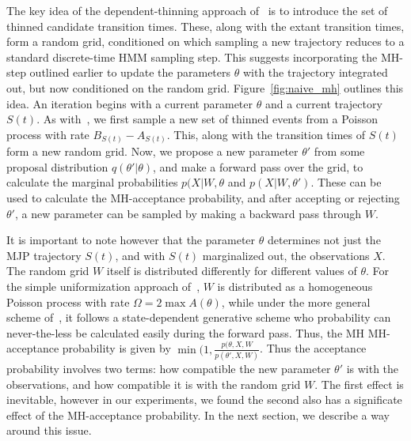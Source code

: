 The key idea of the dependent-thinning approach of~\cite{RaoTeh13} is
to introduce the set of thinned candidate transition times. These,
along with the extant transition times, form a random grid,
conditioned on which sampling a new trajectory reduces to a 
standard discrete-time HMM sampling step. This suggests incorporating
the MH-step outlined earlier to update the parameters $\theta$
with the trajectory integrated out, but now conditioned on the random
grid. Figure~\ref{fig:naive_mh} outlines this idea.
An iteration begins with a current parameter $\theta$ and a current
trajectory $S(t)$. As with~\cite{RaoTeh12}, we first sample
a new set of thinned events from a Poisson process with rate
$B_{S(t)}-A_{S(t)}$. This, along with the transition times of
$S(t)$ form a new random grid. Now, we propose a new parameter 
$\theta'$ from some proposal distribution $q(\theta'|\theta)$,
and make a forward pass over the grid, to calculate the marginal
probabilities $p(X|W,\theta$ and $p(X|W,\theta')$. These can be
used to calculate the MH-acceptance probability, and after accepting
or rejecting $\theta'$, a new parameter can be sampled by making
a backward pass through $W$.

It is important to note however that the parameter $\theta$
determines not just the MJP trajectory $S(t)$, and with $S(t)$ 
marginalized out, the observations $X$. The random grid $W$ itself
is distributed differently for different values of $\theta$. For
the simple uniformization approach of~\cite{RaoTeh13}, $W$ is
distributed as a homogeneous Poisson process with rate $\Omega = 
2 \max A(\theta)$, while under the more general scheme of~\cite{RaoTeh12},
it follows a state-dependent generative scheme who probability can
never-the-less be calculated easily during the forward pass.
Thus, the MH MH-acceptance probability is given by $\min(1,
  \frac{p(\theta,X,W}{p(\theta',X,W)}$. Thus the acceptance probability
involves two terms: how compatible the new parameter $\theta'$ is
with the observations, and how compatible it is with the random
grid $W$. The first effect is inevitable, however in our experiments,
we found the second also has a significate effect of the MH-acceptance
probability. In the next section, we describe a way around this
issue. 
